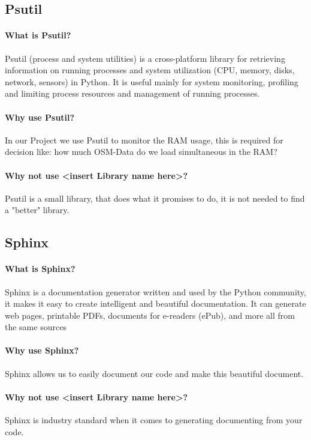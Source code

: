 \documentclass[letterpaper,10pt,english]{sphinxmanual}
\begin{document}
\subsection{Psutil}
\paragraph{What is Psutil?}
Psutil (process and system utilities) is a cross-platform library for retrieving information on running processes and system utilization (CPU, memory, disks, network, sensors) in Python. It is useful mainly for system monitoring, profiling and limiting process resources and management of running processes. 

\paragraph{Why use Psutil?}
In our Project we use Psutil to monitor the RAM usage, this is required for decision like: how much OSM-Data do we load simultaneous in the RAM?

\paragraph{Why not use <insert Library name here>?}
Psutil is a small  library, that does what it promises to do, it is not needed to find a "better" library.



\subsection{Sphinx}

\paragraph{What is Sphinx?}
Sphinx is a documentation generator written and used by the Python community, it makes it easy to create intelligent and beautiful documentation.
It can generate web pages, printable PDFs, documents for e-readers (ePub), and more all from the same sources

\paragraph{Why use Sphinx?}
Sphinx allows us to easily document our code and make this beautiful document.

\paragraph{Why not use <insert Library name here>?}
Sphinx is industry standard when it comes to generating documenting from your code.
\end{document}

